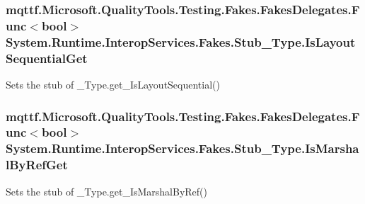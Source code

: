 \hypertarget{class_system_1_1_runtime_1_1_interop_services_1_1_fakes_1_1_stub___type_a0be08e82b891d93232203e551f41d3d5}{
\subsubsection[{Is\-Layout\-Sequential\-Get}]{\setlength{\rightskip}{0pt plus 5cm}mqttf.\-Microsoft.\-Quality\-Tools.\-Testing.\-Fakes.\-Fakes\-Delegates.\-Func$<$bool$>$ System.\-Runtime.\-Interop\-Services.\-Fakes.\-Stub\-\_\-\-Type.\-Is\-Layout\-Sequential\-Get}}\label{class_system_1_1_runtime_1_1_interop_services_1_1_fakes_1_1_stub___type_a0be08e82b891d93232203e551f41d3d5}


Sets the stub of \-\_\-\-Type.\-get\-\_\-\-Is\-Layout\-Sequential()

\hypertarget{class_system_1_1_runtime_1_1_interop_services_1_1_fakes_1_1_stub___type_ab6c43eaaaddecd63a9a10559fa72de4b}{
\subsubsection[{Is\-Marshal\-By\-Ref\-Get}]{\setlength{\rightskip}{0pt plus 5cm}mqttf.\-Microsoft.\-Quality\-Tools.\-Testing.\-Fakes.\-Fakes\-Delegates.\-Func$<$bool$>$ System.\-Runtime.\-Interop\-Services.\-Fakes.\-Stub\-\_\-\-Type.\-Is\-Marshal\-By\-Ref\-Get}}\label{class_system_1_1_runtime_1_1_interop_services_1_1_fakes_1_1_stub___type_ab6c43eaaaddecd63a9a10559fa72de4b}


Sets the stub of \-\_\-\-Type.\-get\-\_\-\-Is\-Marshal\-By\-Ref()

